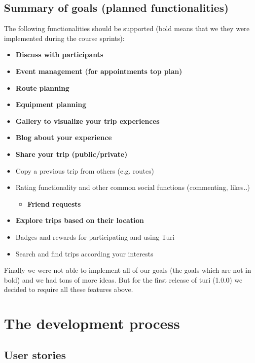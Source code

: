 \documentclass[a4paper]{article}
\begin{document}
\subsection{Summary of goals (planned functionalities)}
The following functionalities should be supported (bold means that we they were implemented during the course sprints):
\begin{itemize}
  \item {\textbf{Discuss with participants}}
  \item {\textbf{Event management (for appointments top plan)}}
  \item {\textbf{Route planning}}
  \item {\textbf{Equipment planning}}
  \item {\textbf{Gallery to visualize your trip experiences}}
  \item {\textbf{Blog about your experience}}
  \item {\textbf{Share your trip (public/private)}}
  \item {Copy a previous trip from others (e.g. routes)}
  \item {Rating functionality and other common social functions (commenting, likes..)
  \begin{itemize}
    \item {\textbf{Friend requests}}
  \end{itemize}}
  \item {\textbf{Explore trips based on their location}}
  \item {Badges and rewards for participating and using Turi}
  \item {Search and find trips according your interests}
\end{itemize}

\noindent
Finally we were not able to implement all of our goals (the goals which are not in bold) and we had tons of more ideas. But for the first release of turi (1.0.0) we decided to require all these features above.\\


\section{The development process}

\subsection{User stories}
\label{sec:user-stories}
\end{document}
